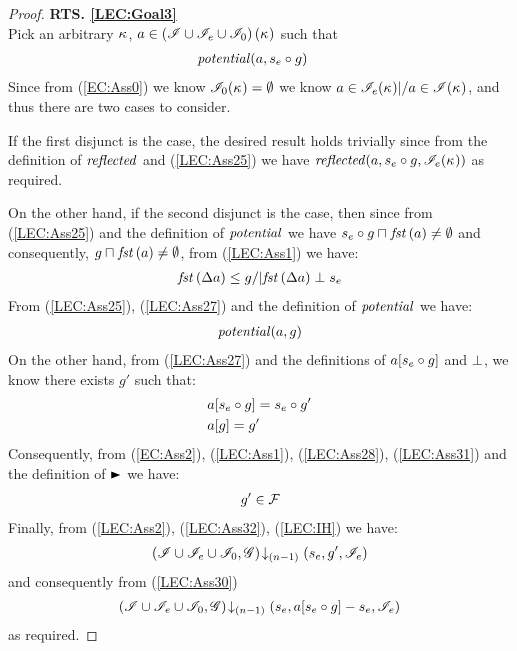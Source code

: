 \begin{lemma}
\begin{proof}
\noindent\textbf{RTS. \ref{LEC:Goal3}}\\
Pick an arbitrary $\kappa_{}$, $a \in \left(\mathscr{I} \cup \mathscr{I}_e \cup \mathscr{I}_0 \right)(\kappa_{})$ such that
%
\begin{align}
	& \mathit{potential}(a, s_e \circ g)  \label{LEC:Ass25}
\end{align}
Since from (\ref{EC:Ass0}) we know $\mathscr{I}_0(\kappa_{}) = \emptyset$ we know $a \in \mathscr{I}_e(\kappa_{}) |/  a \in\mathscr{I}(\kappa_{})$, and thus there are two cases to consider. 

If the first disjunct is the case, the desired result holds trivially since from the definition of $\mathit{reflected}$ and (\ref{LEC:Ass25}) we have $\mathit{reflected}(a, s_e \circ g, \mathscr{I}_e(\kappa_{}))$ as required.

On the other hand, if the second disjunct is the case, then since from (\ref{LEC:Ass25}) and the definition of $\mathit{potential}$ we have $s_e \circ g \sqcap_{} \mathit{fst}\left(a\right) \not= \emptyset$ and consequently, $g \sqcap_{} \mathit{fst}\left(a\right) \not= \emptyset$, from (\ref{LEC:Ass1}) we have:
%
\begin{align}
	\mathit{fst}\left(\Delta {a}\right) \leq g /| \mathit{fst}\left(\Delta {a}\right) \mathrel{\bot} s_e \label{LEC:Ass27}
\end{align}
% 
From (\ref{LEC:Ass25}), (\ref{LEC:Ass27}) and the definition of $\mathit{potential}$ we have:
%
\begin{align}
	\mathit{potential}(a, g) \label{LEC:Ass28}
\end{align}
%
On the other hand, from (\ref{LEC:Ass27}) and the definitions of $a[s_e \circ g]$ and $\mathrel{\bot}$, we know there exists $g'$ such that: 
%
\begin{align}
	& a[s_e \circ g] = s_e \circ g' \label{LEC:Ass30}\\
	& a[g] = g'  \label{LEC:Ass31}
\end{align}
%
Consequently, from (\ref{EC:Ass2}), (\ref{LEC:Ass1}), (\ref{LEC:Ass28}),  (\ref{LEC:Ass31}) and the definition of $\strictfences$ we have:
%
\begin{align}
	g' \in \mathcal{F}_{}  \label{LEC:Ass32}
\end{align}
%
Finally, from (\ref{LEC:Ass2}), (\ref{LEC:Ass32}), (\ref{LEC:IH}) we have:
%
\begin{align*}
	\left(\mathscr{I} \cup \mathscr{I}_{e} \cup \mathscr{I}_0, \mathscr{G}\right) \!\downarrow_{(n-1)} \left(s_e, g', \mathscr{I}_e\right)
\end{align*}
%
and consequently from (\ref{LEC:Ass30})
%
\begin{align*}
	\left(\mathscr{I} \cup \mathscr{I}_{e} \cup \mathscr{I}_0, \mathscr{G}\right) \!\downarrow_{(n-1)} \left(s_e, a[s_e \circ g] - s_e, \mathscr{I}_e\right)
\end{align*}
%
as required.
\end{proof}
\end{lemma}
%
%
%
%
%
%
%
%
%
%
%

